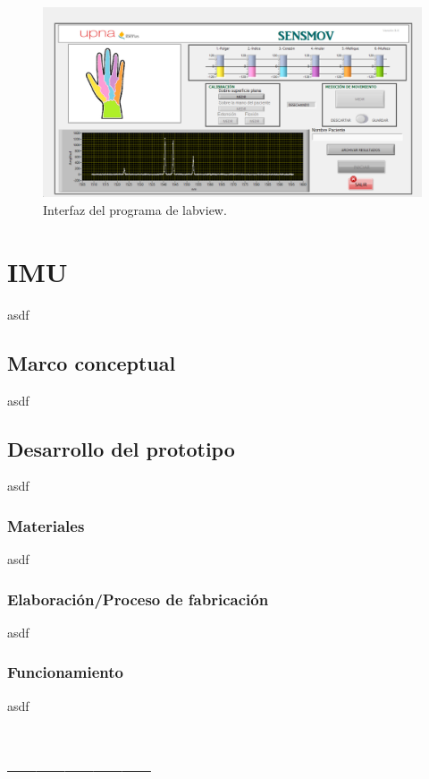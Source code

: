 \begin{figure}[H]
	\centering
	\includegraphics[width=1\textwidth]{./img/interfazSM}
	\caption{Interfaz del programa de labview.}
	\label{fig:interfaz}
\end{figure}

\section{IMU}
\label{sec:IMU3}
asdf

\subsection{Marco conceptual}
\label{sec:mc3IMU}
asdf

\subsection{Desarrollo del prototipo}
\label{sec:prot3IMU}
asdf

\subsubsection{Materiales}
asdf


\subsubsection{Elaboración/Proceso de fabricación}
asdf

\subsubsection{Funcionamiento}
asdf




\section{---------------}


